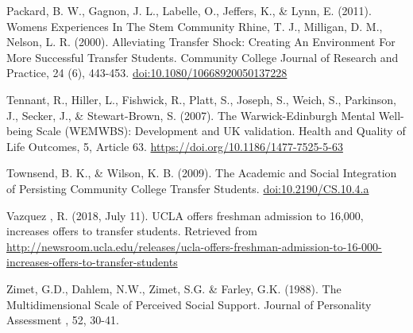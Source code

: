\documentclass[]{book}
\begin{document}
Packard, B. W., Gagnon, J. L., Labelle, O., Jeffers, K., \& Lynn, E. (2011). Womens Experiences In The Stem Community Rhine, T. J., Milligan, D. M., Nelson, L. R. (2000). Alleviating Transfer Shock: Creating An Environment For More Successful Transfer Students. Community College Journal of Research and Practice, 24 (6), 443-453. \url{doi:10.1080/10668920050137228}

Tennant, R., Hiller, L., Fishwick, R., Platt, S., Joseph, S., Weich, S., Parkinson, J., Secker, J., \& Stewart-Brown, S. (2007). The Warwick-Edinburgh Mental Well-being Scale
(WEMWBS): Development and UK validation. Health and Quality of Life Outcomes, 5,
Article 63. \url{https://doi.org/10.1186/1477-7525-5-63}

Townsend, B. K., \& Wilson, K. B. (2009). The Academic and Social Integration of Persisting
Community College Transfer Students. \url{doi:10.2190/CS.10.4.a}

Vazquez , R. (2018, July 11). UCLA offers freshman admission to 16,000, increases offers to
transfer students. Retrieved from
\url{http://newsroom.ucla.edu/releases/ucla-offers-freshman-admission-to-16-000-increases-offers-to-transfer-students}

Zimet, G.D., Dahlem, N.W., Zimet, S.G. \& Farley, G.K. (1988). The Multidimensional Scale of
Perceived Social Support. Journal of Personality Assessment , 52, 30-41.


\end{document}
